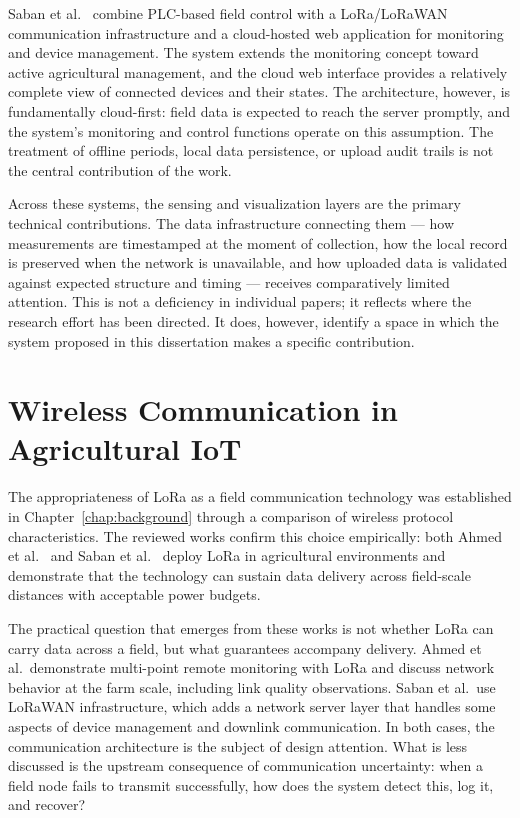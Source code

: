 Saban et al.~\cite{saban2023smart_agricultural_lora_cloud} combine PLC-based
field control with a LoRa/LoRaWAN communication infrastructure and a
cloud-hosted web application for monitoring and device management. The system
extends the monitoring concept toward active agricultural management, and the
cloud web interface provides a relatively complete view of connected devices
and their states. The architecture, however, is fundamentally cloud-first:
field data is expected to reach the server promptly, and the system's
monitoring and control functions operate on this assumption. The treatment of
offline periods, local data persistence, or upload audit trails is not the
central contribution of the work.

Across these systems, the sensing and visualization layers are the primary
technical contributions. The data infrastructure connecting them --- how
measurements are timestamped at the moment of collection, how the local record
is preserved when the network is unavailable, and how uploaded data is
validated against expected structure and timing --- receives comparatively
limited attention. This is not a deficiency in individual papers; it reflects
where the research effort has been directed. It does, however, identify a
space in which the system proposed in this dissertation makes a specific
contribution.

\section{Wireless Communication in Agricultural IoT}
\label{sec:wireless-communication}

The appropriateness of LoRa as a field communication technology was established
in Chapter~\ref{chap:background} through a comparison of wireless protocol
characteristics. The reviewed works confirm this choice empirically: both Ahmed
et al.~\cite{ahmed2022lora_agriculture_chile} and Saban et
al.~\cite{saban2023smart_agricultural_lora_cloud} deploy LoRa in agricultural
environments and demonstrate that the technology can sustain data delivery
across field-scale distances with acceptable power budgets.

The practical question that emerges from these works is not whether LoRa can
carry data across a field, but what guarantees accompany delivery. Ahmed et
al.\ demonstrate multi-point remote monitoring with LoRa and discuss network
behavior at the farm scale, including link quality observations. Saban et al.\
use LoRaWAN infrastructure, which adds a network server layer that handles
some aspects of device management and downlink communication. In both cases,
the communication architecture is the subject of design attention. What is less
discussed is the upstream consequence of communication uncertainty: when a
field node fails to transmit successfully, how does the system detect this, log
it, and recover?

